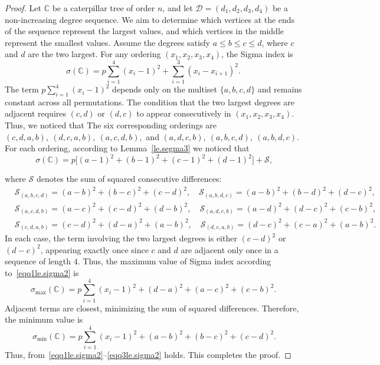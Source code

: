 \documentclass[10pt,a4paper]{amsart}
\newcommand{\CC}{\mathbb{C}}
\begin{document}
\begin{proof}
Let $\CC$ be a caterpillar tree of order $n$, and let $\mathscr{D} = (d_1, d_2, d_3, d_4)$ be a non-increasing degree sequence. We aim to determine which vertices at the ends of the sequence represent the largest values, and which vertices in the middle represent the smallest values.  Assume the degrees satisfy $a \leq b \leq c \leq d$, where $c$ and $d$ are the two largest. For any ordering $(x_1,x_2,x_3,x_4)$, the Sigma index is
$$
\sigma(\CC) = p\sum_{i=1}^{4}(x_i-1)^2 + \sum_{i=1}^{3}(x_i-x_{i+1})^2.
$$
The term $p\sum_{i=1}^{4}(x_i-1)^2$ depends only on the multiset $\{a,b,c,d\}$ and remains constant across all permutations. The condition that the two largest degrees are adjacent requires $(c,d)$ or $(d,c)$ to appear consecutively in $(x_1,x_2,x_3,x_4)$. Thus, we noticed that The six corresponding orderings are
$(c,d,a,b),\ (d,c,a,b),\ (a,c,d,b),$ and $(a,d,c,b),\ (a,b,c,d),\ (a,b,d,c).$ For each ordering, according to Lemma~\ref{le.segma3} we noticed that
\begin{equation}~\label{eqq1le.sigma2}
\sigma(\CC)= p\big[(a-1)^2+(b-1)^2+(c-1)^2+(d-1)^2\big] + \mathcal{S},
\end{equation}

where $\mathcal{S}$ denotes the sum of squared consecutive differences:
\begin{align*}
 &\mathcal{S}_{(a,b,c,d)}= (a-b)^2 + (b-c)^2 + (c-d)^2, \quad 
\mathcal{S}_{(a,b,d,c)}= (a-b)^2 + (b-d)^2 + (d-c)^2,\\
&\mathcal{S}_{(a,c,d,b)}= (a-c)^2 + (c-d)^2 + (d-b)^2,\quad
\mathcal{S}_{(a,d,c,b)}= (a-d)^2 + (d-c)^2 + (c-b)^2,\\
&\mathcal{S}_{(c,d,a,b)}= (c-d)^2 + (d-a)^2 + (a-b)^2,\quad
\mathcal{S}_{(d,c,a,b)}= (d-c)^2 + (c-a)^2 + (a-b)^2.
\end{align*}
In each case, the term involving the two largest degrees is either $(c-d)^2$ or $(d-c)^2$, appearing exactly once since $c$ and $d$ are adjacent only once in a sequence of length $4$.
Thus, the maximum value of Sigma index according to~\eqref{eqq1le.sigma2} is 
\begin{equation}
\sigma_{\max}(\CC)=p \sum_{i=1}^{4} (x_i - 1)^2 + (d-a)^2 + (a-c)^2 + (c-b)^2.
\end{equation}
Adjacent terms are closest, minimizing the sum of squared differences. Therefore, the minimum value  is 
\begin{equation}~\label{eqq3le.sigma2}
 \sigma_{\min}(\CC)= p \sum_{i=1}^{4} (x_i - 1)^2 + (a-b)^2 + (b-c)^2 + (c-d)^2.
\end{equation}
Thus, from~\eqref{eqq1le.sigma2}--\eqref{eqq3le.sigma2} holds.
This completes the proof.
\end{proof}
\end{document}
